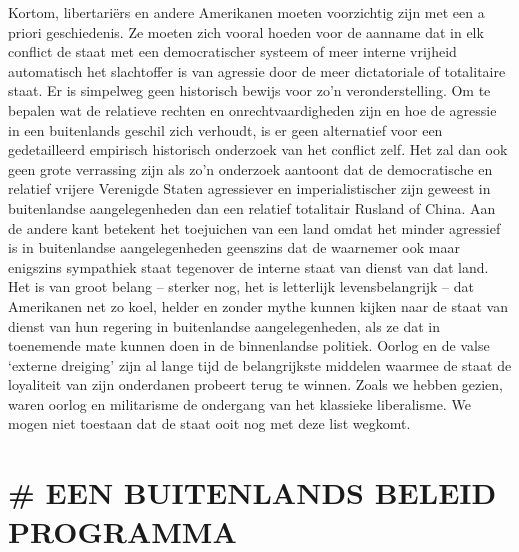 \documentclass[
  a5paper,
  smalldemyvopaper,10pt,twoside,onecolumn,openright,extrafontsizes,hidelinks]{memoir}
\begin{document}
Kortom, libertariërs en andere Amerikanen moeten voorzichtig zijn met
een a priori geschiede­nis. Ze moeten zich vooral hoeden voor de aanname
dat in elk conflict de staat met een democratischer systeem of meer
interne vrijheid automatisch het slachtoffer is van agressie door de
meer dictatoriale of totalitaire staat. Er is simpelweg geen historisch
bewijs voor zo'n veronderstelling. Om te bepalen wat de relatieve
rechten en onrechtvaardigheden zijn en hoe de agressie in een
buitenlands geschil zich verhoudt, is er geen alternatief voor een
gedetailleerd empirisch historisch onderzoek van het conflict zelf. Het
zal dan ook geen grote verrassing zijn als zo'n onderzoek aantoont dat
de democratische en relatief vrijere Verenigde Staten agressiever en
imperialistischer zijn geweest in buitenlandse aangelegenheden dan een
relatief totalitair Rusland of China. Aan de andere kant betekent het
toejuichen van een land omdat het minder agressief is in buitenlandse
aangelegenheden geenszins dat de waarnemer ook maar enigszins sympathiek
staat tegenover de interne staat van dienst van dat land. Het is van
groot belang -- sterker nog, het is letterlijk levensbelangrijk -- dat
Amerikanen net zo koel, helder en zonder mythe kunnen kijken naar de
staat van dienst van hun regering in buitenlandse aangelegenheden, als
ze dat in toenemende mate kunnen doen in de binnenlandse politiek.
Oorlog en de valse `externe dreiging' zijn al lange tijd de
belangrijkste middelen waarmee de staat de loyaliteit van zijn
onderdanen probeert terug te winnen. Zoals we hebben gezien, waren
oorlog en militarisme de ondergang van het klassieke liberalisme. We
mogen niet toestaan dat de staat ooit nog met deze list wegkomt.

\section{\# EEN BUITENLANDS BELEID
PROGRAMMA}\label{een-buitenlands-beleid-programma}
\end{document}
